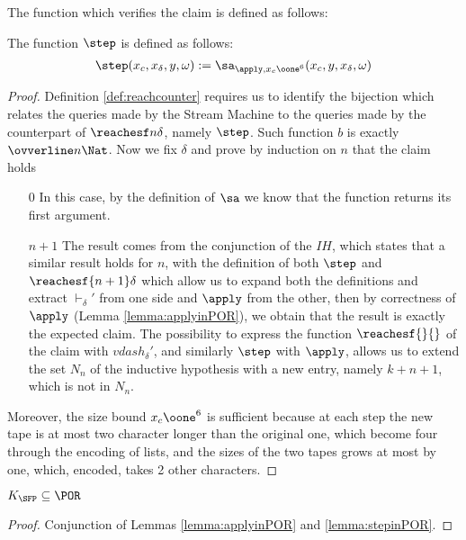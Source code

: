 \begin{conditional}{\notappendix}
    The function which verifies the claim is defined as follows:

    \begin{defn}[$\step$]
      The function $\step$ is defined as follows:
      \begin{align*}
        \step(x_c, x_\delta, y, \omega) := \sa_{\apply, x_c\oone^6}(x_c, y, x_\delta, \omega)
      \end{align*}
    \end{defn}
    \begin{proof}
      Definition \ref{def:reachcounter} requires us to identify the bijection
      which relates the queries made by the Stream Machine to the queries
      made by the counterpart of $\reachesf n \delta$, namely $\step$.
      Such function $b$ is exactly $\ovverline n \Nat$.
      Now we fix $\delta$ and prove by induction on $n$ that the claim holds
      \begin{itemize}
        \item [0] In this case, by the definition of $\sa$ we know that
        the function returns its first argument.
        \item[$n+1$] The result comes from the conjunction of the $IH$, which
        states that a similar result holds for $n$, with the definition of
        both $\step$ and $\reachesf {n+1} \delta$ which allow us to expand both
        the definitions and extract $\vdash_\delta'$ from one side and $\apply$
        from the other, then by correctness of
        $\apply$ (Lemma \ref{lemma:applyinPOR}), we obtain that the result is
        exactly the expected claim. The possibility to express the function
        $\reachesf{}{}$ of the claim with $vdash_\delta'$, and similarly
        $\step$ with $\apply$, allows us to extend the set $N_n$ of the inductive
        hypothesis with a new entry, namely $k+n+1$, which is not in $N_n$.
      \end{itemize}
    Moreover, the size bound $x_c\oone^6$ is sufficient because at each step
    the new tape is at most two character longer than the original one,
    which become four through the encoding of lists, and the sizes of the two
    tapes grows at most by one, which, encoded, takes 2 other characters.
    \end{proof}

    \begin{lemma}
      $K_\SFP \subseteq \POR$
    \end{lemma}
    \begin{proof}
      Conjunction of Lemmas \ref{lemma:applyinPOR} and \ref{lemma:stepinPOR}.
    \end{proof}

















\end{conditional}
